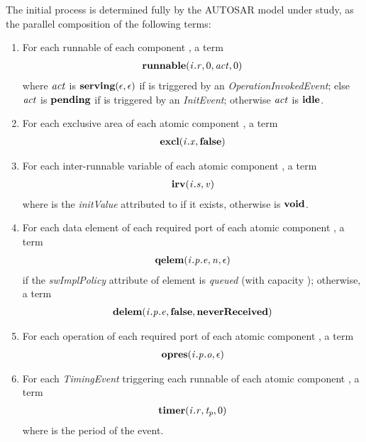 \documentclass[twocolumn]{article}
\begin{document}
The initial process  is determined fully by the AUTOSAR model under study, as the parallel composition of the following terms:
\begin{enumerate}

\item For each runnable  of each component , a term
\[
\begin{array}{c}
  \Trunnable{\Tr{\V{R}}{\V{I}}}{0}{\Act}{0}
\end{array}
\]
where $\Act$ is $\textbf{serving}(\epsilon,\epsilon)$ if  is triggered by an \emph{OperationInvokedEvent}; else $\Act$ is $\textbf{pending}$ if  is triggered by an \emph{InitEvent}; otherwise $\Act$ is $\textbf{idle}$.

\item For each exclusive area  of each atomic component , a term
\[
\begin{array}{c}
  \Texcl{\Tx{\V{X}}{\V{I}}}{\Tfalse}
\end{array}
\]

\item For each inter-runnable variable  of each atomic component , a term
\[
\begin{array}{c}
  \Tirv{\Ts{\V{S}}{\V{I}}}{\V{V}}
\end{array}
\]
where  is the \emph{initValue} attributed to  if it exists, otherwise  is $\textbf{void}$.

\item For each data element  of each required port  of each atomic component , a term
\[
\begin{array}{c}
  \Tqelem{\Tep{\V{E}}{\V{P}}{\V{I}}}{\V{N}}{\epsilon}
\end{array}
\]
if the \emph{swImplPolicy} attribute of element  is \emph{queued} (with capacity ); otherwise, a term
\[
\begin{array}{c}
  \Tdelem{\Tep{\V{E}}{\V{P}}{\V{I}}}{\Tfalse}{\TneverReceived}
\end{array}
\]

\item For each operation  of each required port  of each atomic component , a term
\[
\begin{array}{c}
  \Topres{\Tep{\V{O}}{\V{P}}{\V{I}}}{\epsilon}
\end{array}
\]

\item For each \emph{TimingEvent} triggering each runnable  of each atomic component , a term
\[
\begin{array}{c}
  \Ttimer{\Tr{\V{R}}{\V{I}}}{\V{T_p}}{0}
\end{array}
\]
where  is the period of the event.

\end{enumerate}
\end{document}

